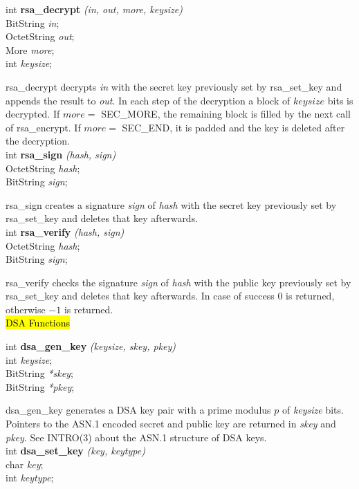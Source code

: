 int {\bf rsa\_decrypt} {\em (in, out, more, keysize)} \\
BitString {\em *in}; \\
OctetString {\em *out}; \\
More {\em more}; \\
int {\em keysize}; 

rsa\_decrypt decrypts {\em in} with the secret key previously set by 
rsa\_set\_key and appends the result
to {\em out}. In each step of the decryption a block of
$keysize$ bits is decrypted. If $more =$ SEC\_MORE,
the remaining block is filled by the next call of  rsa\_encrypt.
If $more =$ SEC\_END, it is padded and the key is deleted
after the decryption.
\\ [1ex]


int {\bf rsa\_sign} {\em (hash, sign)} \\
OctetString {\em *hash}; \\
BitString {\em *sign}; 

rsa\_sign creates a signature {\em sign} of {\em hash} with the secret key previously 
set by rsa\_set\_key
and deletes that key afterwards.
\\ [1ex]


int {\bf rsa\_verify} {\em (hash, sign)} \\
OctetString {\em *hash}; \\
BitString {\em *sign}; 

rsa\_verify checks the signature {\em sign} of {\em hash} with the public key previously
set by rsa\_set\_key
and deletes that key afterwards. In case of success $0$ is returned, otherwise
$-1$ is returned.
\\ [1ex]


\hl{DSA Functions}


int {\bf dsa\_gen\_key} {\em (keysize, skey, pkey)} \\
int {\em keysize}; \\
BitString {\em **skey}; \\
BitString {\em **pkey}; 

dsa\_gen\_key generates a DSA key pair with a prime modulus $p$ of {\em keysize} bits.
Pointers to the ASN.1 encoded secret and public key are returned in {\em *skey} and {\em *pkey}.
See INTRO(3) about the ASN.1 structure of DSA keys.
\\ [1ex]

int {\bf dsa\_set\_key} {\em (key, keytype)} \\
char {\em *key}; \\
int {\em keytype}; 


